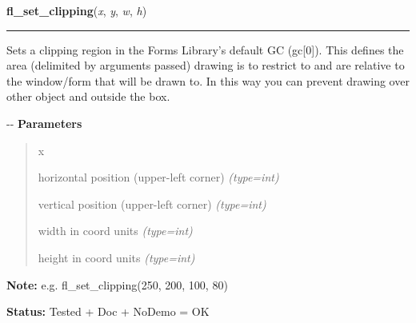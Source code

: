 \hspace{.8\funcindent}\begin{boxedminipage}{\funcwidth}

    \raggedright \textbf{fl\_set\_clipping}(\textit{x}, \textit{y}, \textit{w}, \textit{h})

    \vspace{-1.5ex}

    \rule{\textwidth}{0.5\fboxrule}
\setlength{\parskip}{2ex}

Sets a clipping region in the Forms Library's default GC (gc{[}0{]}).
This defines the area (delimited by arguments passed) drawing is to
restrict to and are relative to the window/form that will be drawn to.
In this way you can prevent drawing over other object and outside the
box.

-{}-
\setlength{\parskip}{1ex}
      \textbf{Parameters}
      \vspace{-1ex}

      \begin{quote}
        \begin{Ventry}{x}

          \item[x]


horizontal position (upper-left corner)
            {\it (type=int)}

          \item[y]


vertical position (upper-left corner)
            {\it (type=int)}

          \item[w]


width in coord units
            {\it (type=int)}

          \item[h]


height in coord units
            {\it (type=int)}

        \end{Ventry}

      \end{quote}

\textbf{Note:} 
e.g. fl\_set\_clipping(250, 200, 100, 80)


\textbf{Status:} 
Tested + Doc + NoDemo = OK


    \end{boxedminipage}

    \label{xformslib:flxbasic:fl_set_clippings}

